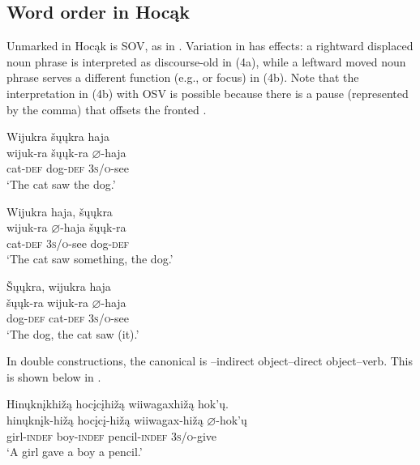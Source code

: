 \documentclass[output=paper]{LSP/langsci}
\begin{document}
\subsection{Word order in Hocąk}

Unmarked  in Hocąk is SOV, as in . Variation in  has  effects: a rightward displaced noun phrase is interpreted as discourse-old in (4a), while a leftward moved noun phrase serves a different  function (e.g.,  or focus) in (4b). Note that the interpretation in (4b) with OSV  is possible because there is a pause (represented by the comma) that offsets the fronted .

\begin{exe}

\ex\label{ex:rosen:3} \glll Wijukra šųųkra haja \\
 wijuk-ra šųųk-ra {$\varnothing$}-haja\\
cat-\textsc{def} dog-\textsc{def} \textsc{3s/o}-see\\
\glt `The cat saw the dog.'

\end{exe}

\begin{exe}
\ex\label{ex:rosen:4}
\begin{xlist}

\ex \glll Wijukra  haja, šųųkra \\
 wijuk-ra {$\varnothing$}-haja  šųųk-ra\\
cat-\textsc{def}  \textsc{3s/o}-see dog-\textsc{def}\\
\glt `The cat saw something, the dog.' 

\ex \glll \v{S}ųųkra, wijukra haja  \\
 šųųk-ra wijuk-ra {$\varnothing$}-haja  \\
dog-\textsc{def} cat-\textsc{def}  \textsc{3s/o}-see \\
\glt `The dog, the cat saw (it).' 

\end{xlist}
\end{exe}

In double  constructions, the canonical  is --indirect object--direct object--verb. This is shown below in .

\begin{exe}

\ex \label{ex:rosen:5}\glll Hinųknįkhižą hocįcįhižą wiiwagaxhižą hok'ų.\\
hinųknįk-hižą hocįcį-hižą wiiwagax-hižą {$\varnothing$}-hok'ų\\
girl-\textsc{indef} boy-\textsc{indef} pencil-\textsc{indef} \textsc{3s/o}-give\\
\glt `A girl gave a boy a pencil.'

\end{exe}
\end{document}
